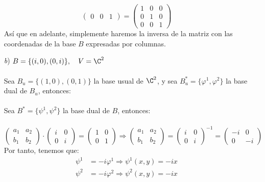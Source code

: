 \begin{ejercicio}
\begin{itemize}
\begin{equation*}
\begin{pmatrix}
					0 & 0 & 1
				\end{pmatrix} = \begin{pmatrix}
					1 & 0 & 0 \\
					0 & 1 & 0 \\
					0 & 0 & 1
				\end{pmatrix}
			\end{equation*}
			Así que en adelante, simplemente haremos la inversa de la matriz con las coordenadas de la base $B$ expresadas por columnas.
		\item[\textit{b})] $B = \{ (i,0),(0,i)\}, \quad V = \C^2$ \\ \\
			Sea $B_u = \{ (1,0),(0,1)\}$ la base usual de $\C^2$, y sea $B_u^{*} = \{ \varphi^1,\varphi^2\}$ la base dual de $B_u$, entonces:
			\\ \\
			Sea $B^* = \{ \psi ^1,\psi ^2\}$ la base dual de $B$, entonces: \\ \\
			\begin{equation*}
				\begin{pmatrix}
					a_1 & a_2 \\
					b_1 & b_2
				\end{pmatrix} \cdot \begin{pmatrix}
					i & 0 \\
					0 & i
				\end{pmatrix} = \begin{pmatrix}
					1 & 0 \\
					0 & 1
				\end{pmatrix} \Rightarrow \begin{pmatrix}
					a_1 & a_2 \\
					b_1 & b_2
				\end{pmatrix} = \begin{pmatrix}
					i & 0 \\
					0 & i
				\end{pmatrix}^{-1} = \begin{pmatrix}
					-i & 0  \\
					0  & -i
				\end{pmatrix}
			\end{equation*}
			Por tanto, tenemos que:
			\begin{align*}
				\psi^1 & = -i \varphi^1 \Rightarrow \psi^1(x,y) = -i x \\
				\psi^2 & = -i \varphi^2 \Rightarrow \psi^2(x,y) = -i x
			\end{align*}

\end{itemize}
\end{ejercicio}
